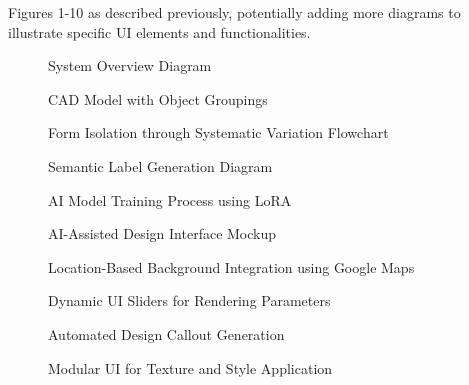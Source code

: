 \documentclass{article}
\begin{document}
Figures 1-10 as described previously, potentially adding more diagrams to illustrate specific UI elements and functionalities.
\begin{figure}[h]
    \centering
    \caption{System Overview Diagram}
    \label{fig:system_overview}
\end{figure}

\begin{figure}[h]
    \centering
    \caption{CAD Model with Object Groupings}
    \label{fig:cad_model_groupings}
\end{figure}

\begin{figure}[h]
    \centering
    \caption{Form Isolation through Systematic Variation Flowchart}
    \label{fig:form_isolation_flowchart}
\end{figure}

\begin{figure}[h]
    \centering
    \caption{Semantic Label Generation Diagram}
    \label{fig:semantic_label_generation}
\end{figure}

\begin{figure}[h]
    \centering
    \caption{AI Model Training Process using LoRA}
    \label{fig:ai_model_training_lora}
\end{figure}

\begin{figure}[h]
    \centering
    \caption{AI-Assisted Design Interface Mockup}
    \label{fig:design_interface_mockup}
\end{figure}

\begin{figure}[h]
    \centering
    \caption{Location-Based Background Integration using Google Maps}
    \label{fig:location_based_background}
\end{figure}

\begin{figure}[h]
    \centering
    \caption{Dynamic UI Sliders for Rendering Parameters}
    \label{fig:dynamic_ui_sliders}
\end{figure}

\begin{figure}[h]
    \centering
    \caption{Automated Design Callout Generation}
    \label{fig:automated_design_callout}
\end{figure}

\begin{figure}[h]
    \centering
    \caption{Modular UI for Texture and Style Application}
    \label{fig:modular_ui_texture_style}
\end{figure}
\end{document}
